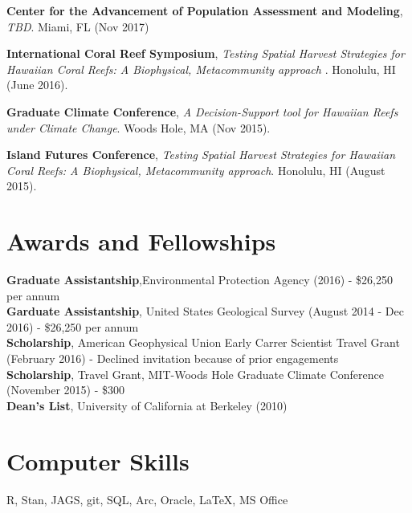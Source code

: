 \documentclass[10pt, letterpaper]{article}
\begin{document}
\noindent \textbf{Center for the Advancement of Population Assessment and Modeling}, \textit{TBD}. Miami, FL (Nov 2017)

\noindent \textbf{International Coral Reef Symposium}, \textit{Testing Spatial Harvest Strategies for Hawaiian Coral Reefs: A Biophysical, Metacommunity approach }. Honolulu, HI (June 2016).

\noindent \textbf{Graduate Climate Conference}, \textit{A Decision-Support tool for Hawaiian Reefs under Climate Change}. Woods Hole, MA (Nov 2015).

\noindent \textbf{Island Futures Conference}, \textit{Testing Spatial Harvest Strategies for Hawaiian Coral Reefs: A Biophysical, Metacommunity approach}. Honolulu, HI (August 2015).

\section*{Awards and Fellowships}
\textbf{Graduate Assistantship},Environmental Protection Agency (2016) - \$26,250 per annum \\
\textbf{Garduate Assistantship}, United States Geological Survey (August 2014 - Dec 2016) - \$26,250 per annum \\
\textbf{Scholarship}, American Geophysical Union Early Carrer Scientist Travel Grant (February 2016) - Declined invitation because of prior engagements \\
\textbf{Scholarship}, Travel Grant, MIT-Woods Hole Graduate Climate Conference (November 2015) - \$300 \\
\textbf{Dean's List}, University of California at Berkeley (2010) \\

\section*{Computer Skills}
 R, Stan, JAGS, git, SQL, Arc, Oracle, \LaTeX, MS Office
\end{document}
